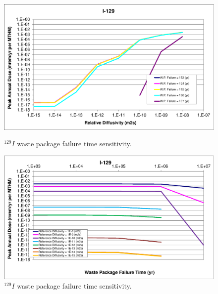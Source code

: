 \begin{figure}[ht!]
\centering
\begin{minipage}[b]{0.45\linewidth}
\includegraphics[width=\linewidth]{./chapters/nuclide_sensitivity/clay/WPFailExtended/I-129.eps}
\caption{$^{129}I$ waste package failure time sensitivity. }
\label{fig:WPFailI129}

\end{minipage}
\hspace{0.05\linewidth}
\begin{minipage}[b]{0.45\linewidth}

\includegraphics[width=\linewidth]{./chapters/nuclide_sensitivity/clay/WPFailExtended/I-129-WPFail.eps}
\caption{$^{129}I$ waste package failure time sensitivity. }
\label{fig:WPFailI129}

\end{minipage}
\end{figure}
